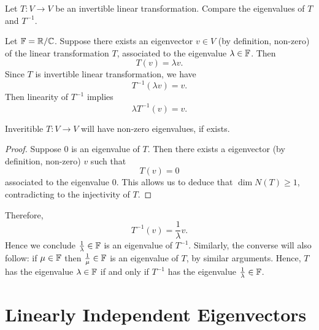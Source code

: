 \documentclass[11pt, a4paper, abstract=true]{scrartcl}
\begin{document}
\begin{problem*}
    Let \(T: V \to V\) be an invertible linear transformation. Compare the eigenvalues of \(T\) and \(T^{-1}\).
\end{problem*}
\begin{soln}
    Let \(\mathbb F = \mathbb R / \mathbb C\). Suppose there exists an eigenvector \(v \in V\) (by definition, non-zero) of the linear transformation \(T\), associated to the eigenvalue \(\lambda \in \mathbb F\). Then \[T(v) = \lambda v.\] Since \(T\) is invertible linear transformation, we have \[T^{-1}(\lambda v) = v.\] Then linearity of \(T^{-1}\) implies \[\lambda T^{-1}(v) = v.\] 
    \begin{claim*}[1]
        Inveritible \(T: V \to V\) will have non-zero eigenvalues, if exists.
    \end{claim*}
    \begin{proof}
        Suppose 0 is an eigenvalue of \(T\). Then there exists a eigenvector (by definition, non-zero) \(v\) such that \[T(v) = 0\] associated to the eigenvalue 0. This allows us to deduce that \(\dim N(T) \geq 1\), contradicting to the injectivity of \(T\).
    \end{proof}

    Therefore, \[T^{-1}(v) = \frac{1}{\lambda} v.\] Hence we conclude \(\frac{1}{\lambda} \in \mathbb F\) is an eigenvalue of \(T^{-1}\). Similarly, the converse will also follow: if \(\mu \in \mathbb F\) then \(\frac{1}{\mu} \in \mathbb F\) is an eigenvalue of \(T\), by similar arguments. Hence, \(T\) has the eigenvalue \(\lambda \in \mathbb F\) if and only if \(T^{-1}\) has the eigenvalue \(\frac{1}{\lambda} \in \mathbb F\).
\end{soln}

\newpage

\section{Linearly Independent Eigenvectors}
\end{document}
